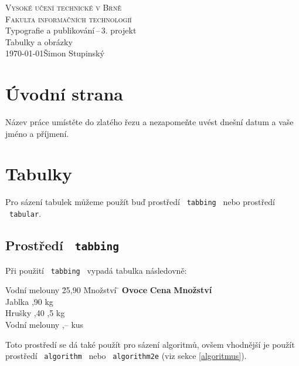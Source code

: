 \documentclass[czech,a4paper,11pt]{article}
\begin{document}
\begin{titlepage} 
\begin{center} 
\textsc{\Huge {Vysoké učení technické v Brně} \\ \medskip \huge {Fakulta informačních technologií}}\\ 
{ \LARGE Typografie a publikování\,--\,3. projekt \\   \Huge {Tabulky a obrázky}}\\
{\Large \today \hfill Šimon Stupinský}
\end{center}
\end{titlepage}

\section{Úvodní strana}
Název práce umístěte do zlatého řezu a nezapomeňte uvést dnešní datum a vaše jméno a příjmení.

\section{Tabulky}
Pro sázení tabulek můžeme použít buď prostředí \ \texttt{tabbing} \ nebo prostředí \ \texttt{tabular}.

\subsection{Prostředí \ \texttt{tabbing}}
Při použití \ \texttt{tabbing} \ vypadá tabulka následovně:
\begin{tabbing}
Vodní melouny \quad \= 25,90 \quad \= Množství \= \kill
\textbf{Ovoce}\> \textbf{Cena}\> \textbf{Množství}\\
Jablka ,90  kg\\
Hrušky ,40 ,5 kg\\
Vodní melouny ,--  kus\\
\end{tabbing}
Toto prostředí se dá také použít pro sázení algoritmů, ovšem vhodnější je použít prostředí \ \texttt{algorithm} \  nebo \ \texttt{algorithm2e} \; (viz sekce \ref{algoritmus}).
\end{document}
